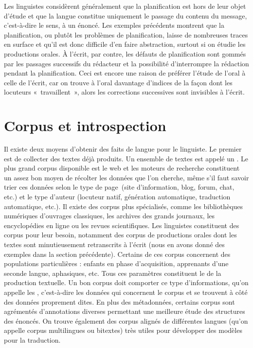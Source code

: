 Les linguistes considèrent généralement que la planification est hors de leur objet d’étude et que la langue constitue uniquement le passage du contenu du message, c’est-à-dire le sens, à un énoncé. Les exemples précédents montrent que la planification, ou plutôt les problèmes de planification, laisse de nombreuses traces en surface et qu’il est donc difficile d’en faire abstraction, surtout si on étudie les productions orales. À l’écrit, par contre, les défauts de planification sont gommés par les passages successifs du rédacteur et la possibilité d’interrompre la rédaction pendant la planification. Ceci est encore une raison de préférer l’étude de l’oral à celle de l’écrit, car on trouve à l’oral davantage d’indices de la façon dont les locuteurs «~travaillent~», alors les corrections successives sont invisibles à l’écrit.

\section{Corpus et introspection}\label{sec:1.1.10}

Il existe deux moyens d’obtenir des faits de langue pour le linguiste. Le premier est de collecter des textes déjà produits. Un ensemble de textes est appelé un . Le plus grand corpus disponible est le web et les moteurs de recherche constituent un assez bon moyen de récolter les données que l’on cherche, même s’il faut savoir trier ces données selon le type de page~(site d’information, blog, forum, chat, etc.) et le type d’auteur (locuteur natif, génération automatique, traduction automatique, etc.). Il existe des corpus plus spécialisés, comme les bibliothèques numériques d’ouvrages classiques, les archives des grands journaux, les encyclopédies en ligne ou les revues scientifiques. Les linguistes constituent des corpus pour leur besoin, notamment des corpus de productions orales dont les textes sont minutieusement retranscrits à l’écrit (nous en avons donné des exemples dans la section précédente). Certains de ces corpus concernent des populations particulières : enfants en phase d’acquisition, apprenants d’une seconde langue, aphasiques, etc. Tous ces paramètres constituent le  de la production textuelle. Un bon corpus doit comporter ce type d’informations, qu’on appelle les , c’est-à-dire les données qui concernent le corpus et se trouvent à côté des données proprement dites. En plus des métadonnées, certains corpus sont agrémentés d’annotations diverses permettant une meilleure étude des structures des énoncés. On trouve également des corpus alignés de différentes langues (qu’on appelle corpus multilingues ou bitextes) très utiles pour développer des modèles pour la traduction.

